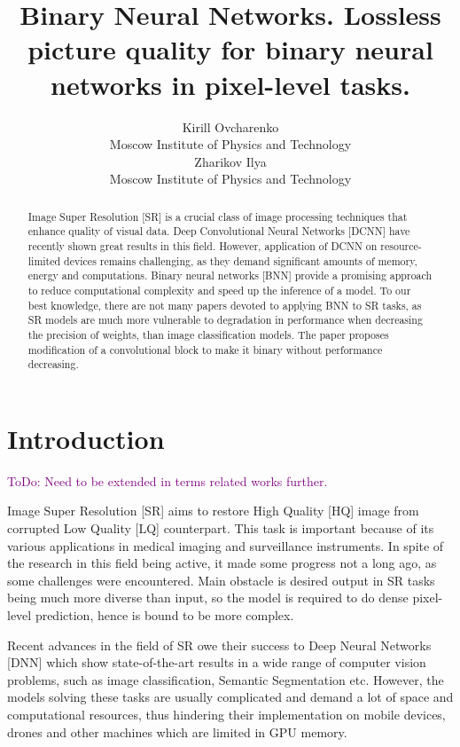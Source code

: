\documentclass{article}
\title{Binary Neural Networks. Lossless picture quality for binary neural networks in pixel-level tasks.}
\author{Kirill Ovcharenko \\
	Moscow Institute of Physics and Technology\\
	\And
	Zharikov Ilya \\
	Moscow Institute of Physics and Technology\\
}
\date{}
\newcommand{\TODO}[1]{\textcolor{purple}{ToDo: #1.}}
\begin{document}
\maketitle

\begin{abstract}
Image Super Resolution [SR] is a crucial class of image processing techniques that enhance quality of visual data. 
Deep Convolutional Neural Networks [DCNN] have recently shown great results in this field. However, application of DCNN on resource-limited devices remains challenging, as they demand significant amounts of memory, energy and computations. Binary neural networks [BNN] provide a promising approach to reduce computational complexity and speed up the inference of a model. To our best knowledge, there are not many papers devoted to applying BNN to SR tasks, as SR models are much more vulnerable to degradation in performance when decreasing the precision of weights, than image classification models. The paper proposes modification of a convolutional block to make it binary without performance decreasing.

\end{abstract}



\section{Introduction}

\TODO{Need to be extended in terms related works further}

Image Super Resolution [SR] aims to restore High Quality [HQ] image from corrupted Low Quality [LQ] counterpart. This task is important because of its various applications in medical imaging and surveillance instruments. In spite of the research in this field being active, it made some progress not a long ago, as some challenges were encountered. Main obstacle is desired output in SR tasks being much more diverse than input, so the model is required to do dense pixel-level prediction, hence is bound to be more complex.  

Recent advances in the field of SR owe their success to Deep Neural Networks [DNN] which show state-of-the-art results in a wide range of computer vision problems, such as image classification, Semantic Segmentation etc. However, the models solving these tasks are usually complicated and demand a lot of space and computational resources, thus hindering their implementation on mobile devices, drones and other machines which are limited in GPU memory.
\end{document}

